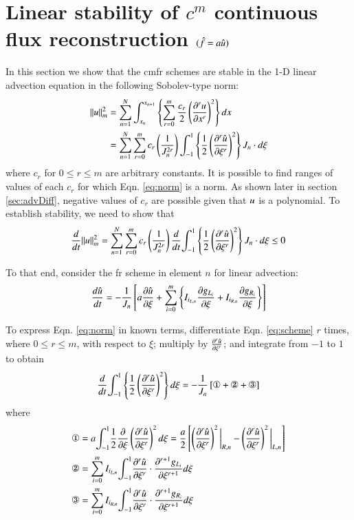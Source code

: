 \section{Linear stability of $c^m$ continuous flux reconstruction $({\hat{f}} = a\hat{u})$}

In this section we show that the \gls{cmfr} schemes are stable in the 1-D linear advection equation in the following Sobolev-type norm:
\begin{equation}\label{eq:norm}
\begin{split}
|| u ||^2_m &=\sum_{n=1}^{N}\int_{x_n}^{x_{n+1}} \left\{ \sum^m_{r=0}
\frac{c_r}{2} \left( {\frac{\partial ^r u}{\partial x^r}} \right)^2 \right\} dx \\
&=\sum_{n=1}^{N}   \sum^m_{r=0}
c_r \left(  \frac{1}{J_n^{2r}}\right) {\int^1_{-1}} \left\{ \frac{1}{2}\left({\frac{\partial^{r} {\hat{u}}}{\partial \xi^{r}}} \right)^2
\right\} J_n \cdot d\xi 
\end{split}
\end{equation}
where $c_r$ for $0 \le r \le m$ are arbitrary constants. %
It is possible to find ranges of values of each $c_r$ for which Eqn. \eqref{eq:norm} is a norm. As shown later in section \ref{sec:advDiff}, negative values of $c_r$ are possible given that $u$ is a polynomial. To establish stability, we need to show that
\begin{equation}
\label{eq:ddnorm}
\frac{d }{d t}||u||^2_m = \sum_{n=1}^{N}   \sum^m_{r=0}
c_r \left(  \frac{1}{J_n^{2r}}\right) \frac{d }{d t}{\int^1_{-1}} \left\{ \frac{1}{2}\left({\frac{\partial^{r} {\hat{u}}}{\partial \xi^{r}}} \right)^2
\right\} J_n \cdot d\xi \le 0
\end{equation} 

To that end, consider the \gls{fr} scheme in element $n$ for linear advection:
\begin{equation}
\label{eq:scheme}
\frac{d \hat{u}}{d t} = -\frac{1}{J_n} \left[ a{\frac{\partial \hat{u}}{\partial \xi}} + \sum_{i=0}^m
\left\{ {I_{i_{L,n}}}
{\frac{\partial {g_{L_i}}}{\partial \xi}} + {I_{i_{R,n}}} {\frac{\partial {g_{R_i}}}{\partial \xi}}\right\} \right]
\end{equation}

To express Eqn. \eqref{eq:norm} in known terms, differentiate Eqn.
\eqref{eq:scheme} $r$ times, where $0\le r\le m$, with respect to $\xi$;
multiply by ${\frac{\partial^{r} {\hat{u}}}{\partial \xi^{r}}}$; and integrate from $-1$ to $1$ to obtain
\begin{equation}
\label{eq:normterm1}
 \DD{}{t}\ioo \l\{ \frac{1}{2}\l( \ddxir{\urd}{r} \r)^2  \r\} d\xi = -\frac{1}{J_n}
\l[\text{\ding{172}}+\text{\ding{173}}+\text{\ding{174}} \r]
\end{equation}
where
\begin{align}
\label{eq:exp1}
 \text{\ding{172}}&= a \ioo \frac{1}{2} \ddxi{}\l( \ddxir{\urd}{r}\r)^2 d\xi=\frac{a}{2}\l[ 
\l( \ddxir{\urd}{r}\r)^2\bigg|_{R,n} - \l( \ddxir{\urd}{r}\r)^2\bigg|_{L,n} \r]\\
\label{eq:normterm2}
\text{\ding{173}}&= \sum^m_{i=0} \IL \ioo \ddxir{\urd}{r}\cdot \ddxir{\gL}{r+1} d\xi\\
\text{\ding{174}}&= \sum^m_{i=0} \IR \ioo \ddxir{\urd}{r}\cdot \ddxir{\gR}{r+1} d\xi
\end{align}


